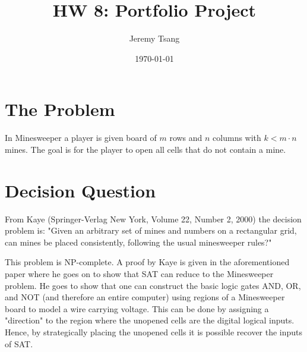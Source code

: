 \documentclass[11pt]{article}
\author{Jeremy Tsang}
\date{\today}
\title{HW 8: Portfolio Project}
\begin{document}
\maketitle
\section*{The Problem}
\label{sec:org1597cf5}
In Minesweeper a player is given board of \(m\) rows and \(n\) columns with \(k < m\cdot n\) mines. The goal is for the player to open all cells that do not contain a mine.
\section*{Decision Question}
\label{sec:orga48a5f2}
From Kaye (Springer-Verlag New York, Volume 22, Number 2, 2000) the decision problem is: "Given an arbitrary set of mines and numbers on a rectangular grid, can mines be placed consistently, following the usual minesweeper rules?"

This problem is NP-complete. A proof by Kaye is given in the aforementioned paper where he goes on to show that SAT can reduce to the Minesweeper problem. He goes to show that one can construct the basic logic gates AND, OR, and NOT (and therefore an entire computer) using regions of a Minesweeper board to model a wire carrying voltage. This can be done by assigning a "direction" to the region where the unopened cells are the digital logical inputs. Hence, by strategically placing the unopened cells it is possible recover the inputs of SAT.
\end{document}
